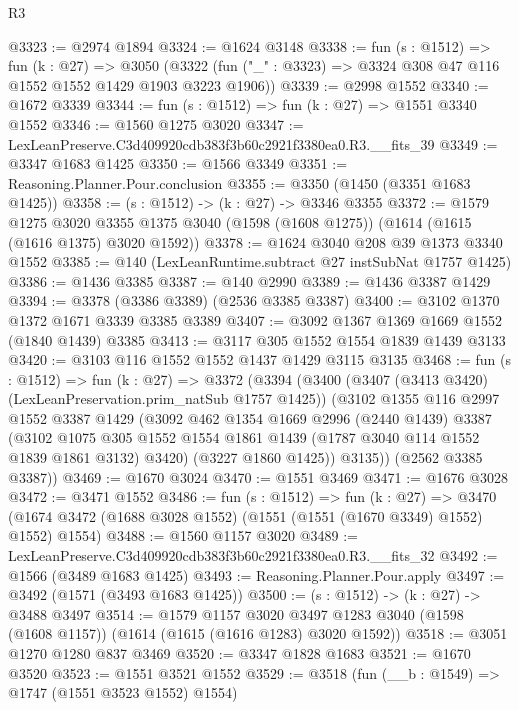 \begin{lexlean}{R3}
\begin{coremodule}
@3323 := @2974 @1894
@3324 := @1624 @3148
@3338 := fun (s : @1512) =>
  fun (k : @27) =>
  @3050 (@3322 (fun ("_" : @3323) => @3324 @308 @47 @116 @1552 @1552 @1429 @1903 @3223 @1906))
@3339 := @2998 @1552
@3340 := @1672 @3339
@3344 := fun (s : @1512) => fun (k : @27) => @1551 @3340 @1552
@3346 := @1560 @1275 @3020
@3347 := LexLeanPreserve.C3d409920cdb383f3b60c2921f3380ea0.R3.__fits_39
@3349 := @3347 @1683 @1425
@3350 := @1566 @3349
@3351 := Reasoning.Planner.Pour.conclusion
@3355 := @3350 (@1450 (@3351 @1683 @1425))
@3358 := (s : @1512) -> (k : @27) -> @3346 @3355
@3372 := @1579
    @1275
    @3020
    @3355
    @1375
    @3040
    (@1598 (@1608 @1275))
    (@1614 (@1615 (@1616 @1375) @3020 @1592))
@3378 := @1624 @3040 @208 @39 @1373 @3340 @1552
@3385 := @140 (LexLeanRuntime.subtract @27 instSubNat @1757 @1425)
@3386 := @1436 @3385
@3387 := @140 @2990
@3389 := @1436 @3387 @1429
@3394 := @3378 (@3386 @3389) (@2536 @3385 @3387)
@3400 := @3102 @1370 @1372 @1671 @3339 @3385 @3389
@3407 := @3092 @1367 @1369 @1669 @1552 (@1840 @1439) @3385
@3413 := @3117 @305 @1552 @1554 @1839 @1439 @3133
@3420 := @3103 @116 @1552 @1552 @1437 @1429 @3115 @3135
@3468 := fun (s : @1512) =>
  fun (k : @27) =>
  @3372
    (@3394
      (@3400
        (@3407 (@3413 @3420) (LexLeanPreservation.prim_natSub @1757 @1425))
        (@3102
          @1355
          @116
          @2997
          @1552
          @3387
          @1429
          (@3092
            @462
            @1354
            @1669
            @2996
            (@2440 @1439)
            @3387
            (@3102
              @1075
              @305
              @1552
              @1554
              @1861
              @1439
              (@1787 @3040 @114 @1552 @1839 @1861 @3132)
              @3420)
            (@3227 @1860 @1425))
          @3135))
      (@2562 @3385 @3387))
@3469 := @1670 @3024
@3470 := @1551 @3469
@3471 := @1676 @3028
@3472 := @3471 @1552
@3486 := fun (s : @1512) =>
  fun (k : @27) =>
  @3470 (@1674 @3472 (@1688 @3028 @1552) (@1551 (@1551 (@1670 @3349) @1552) @1552) @1554)
@3488 := @1560 @1157 @3020
@3489 := LexLeanPreserve.C3d409920cdb383f3b60c2921f3380ea0.R3.__fits_32
@3492 := @1566 (@3489 @1683 @1425)
@3493 := Reasoning.Planner.Pour.apply
@3497 := @3492 (@1571 (@3493 @1683 @1425))
@3500 := (s : @1512) -> (k : @27) -> @3488 @3497
@3514 := @1579
    @1157
    @3020
    @3497
    @1283
    @3040
    (@1598 (@1608 @1157))
    (@1614 (@1615 (@1616 @1283) @3020 @1592))
@3518 := @3051 @1270 @1280 @837 @3469
@3520 := @3347 @1828 @1683
@3521 := @1670 @3520
@3523 := @1551 @3521 @1552
@3529 := @3518 (fun (__b : @1549) => @1747 (@1551 @3523 @1552) @1554)

\end{coremodule}
\end{lexlean}
